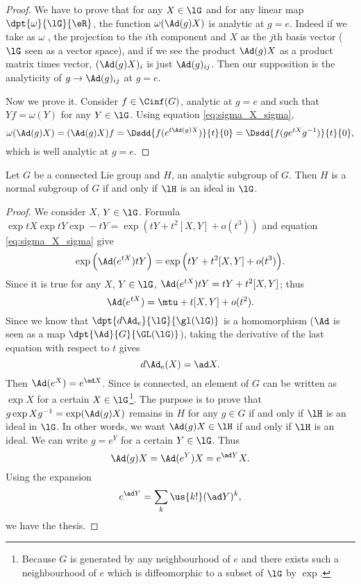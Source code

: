 \begin{proof}
	We have to prove that for any $X\in\lG$ and for any linear map $\dpt{\omega}{\lG}{\eR}$, the function $\omega(\Ad(g)X)$ is analytic at $g=e$. Indeed if we take as $\omega$ , the projection to the $i$th component and $X$ as the $j$th basis vector ($\lG$ seen as a vector space), and if we see the product $\Ad(g)X$ as a product matrix times vector, $(\Ad(g)X)_i$ is just $\Ad(g)_{ij}$. Then our supposition is the analyticity of $g\to\Ad(g)_{ij}$ at $g=e$. 

	Now we prove it. Consider $f\in\Cinf(G)$, analytic at $g=e$ and such that $Yf=\omega(Y)$ for any $Y\in\lG$. Using equation \eqref{eq:sigma_X_sigma},
	\begin{equation}
		\omega(\Ad(g)X)=(\Ad(g)X)f
		=\Dsdd{ f(e^{t\Ad(g)X}) }{t}{0}
		=\Dsdd{ f(g e^{tX}g^{-1}) }{t}{0},
	\end{equation}
	which is well analytic at $g=e$.
\end{proof}


\begin{proposition}
	Let $G$ be a connected Lie group and $H$, an analytic subgroup of $G$. Then $H$ is a normal subgroup of $G$ if and only if $\lH$ is an ideal in $\lG$.
\end{proposition}

\begin{proof}
	We consider $X$, $Y\in\lG$. Formula $\exp tX\exp tY\exp-tY=\exp( tY+t^2[X,Y]+o(t^3) )$ and equation \eqref{eq:sigma_X_sigma} give
	\[
		\exp\Big( \Ad(e^{tX})tY \Big)=\exp\Big(  tY+t^2[X,Y]+o(t^3)  \Big).
	\]
	Since it is true for any $X$, $Y\in\lG$, $\Ad(e^{tX})tY=tY+t^2[X,Y]$; thus
	\begin{equation}
		\Ad(e^{tX})=\mtu+t[X,Y]+o(t^2).
	\end{equation}
	Since we know that $\dpt{d\Ad_e}{\lG}{\gl(\lG)}$ is a homomorphism ($\Ad$ is seen as a map $\dpt{\Ad}{G}{\GL(\lG)}$), taking the derivative of the last equation with respect to $t$ gives
	\begin{equation}
		d\Ad_e(X)=\ad X.
	\end{equation}
	Then $\Ad(e^X)=e^{\ad X}$. Since is connected, an element of $G$ can be written as $\exp X$ for a certain $X\in\lG$\footnote{Because $G$ is generated by any neighbourhood of $e$ and there exists such a neighbourhood of $e$ which is diffeomorphic to a subset of $\lG$ by $\exp$.}. The purpose is to prove that $g\exp Xg^{-1}=\exp(\Ad(g)X)$ remains in $H$ for any $g\in G$ if and only if $\lH$ is an ideal in $\lG$. In other words, we want $\Ad(g)X\in\lH$ if and only if $\lH$ is an ideal. We can write $g=e^Y$ for a certain $Y\in\lG$. Thus
	\[
		\Ad(g)X=\Ad(e^Y)X=e^{\ad Y}X.
	\]
	Using the expansion
	\begin{equation}
		e^{\ad Y}=\sum_k\us{k!}(\ad Y)^k,
	\end{equation}
	we have the thesis.
\end{proof}


